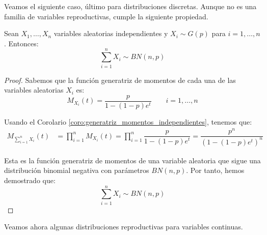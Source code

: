 Veamos el siguiente caso, último para distribuciones discretas. Aunque no es una familia de variables reproductivas, cumple la siguiente propiedad.
\begin{prop}
    Sean $X_1, \dots, X_n$ variables aleatorias independientes y $X_i\sim G(p)$ para $i=1,\dots,n$. Entonces:
    \begin{equation*}
        \sum_{i=1}^{n}X_i \sim BN(n,p)
    \end{equation*}
    \begin{proof}
        Sabemos que la función generatriz de momentos de cada una de las variables aleatorias $X_i$ es:
        \begin{equation*}
            M_{X_i}(t) = \dfrac{p}{1-(1-p)e^t} \qquad i=1,\dots,n
        \end{equation*}

        Usando el Corolario \ref{coro:generatriz_momentos_independientes}, tenemos que:
        \begin{align*}
            M_{\sum\limits_{i=1}^{n}X_i}(t) &= \prod_{i=1}^{n}M_{X_i}(t) = \prod_{i=1}^{n}\dfrac{p}{1-(1-p)e^t} = \dfrac{p^n}{(1-(1-p)e^t)^n}
        \end{align*}

        Esta es la función generatriz de momentos de una variable aleatoria que sigue una distribución binomial negativa con parámetros $BN(n,p)$. Por tanto, hemos demostrado que:
        \begin{equation*}
            \sum_{i=1}^{n}X_i \sim BN(n,p)
        \end{equation*}
    \end{proof}
\end{prop}

Veamos ahora algunas distribuciones reproductivas para variables continuas.


